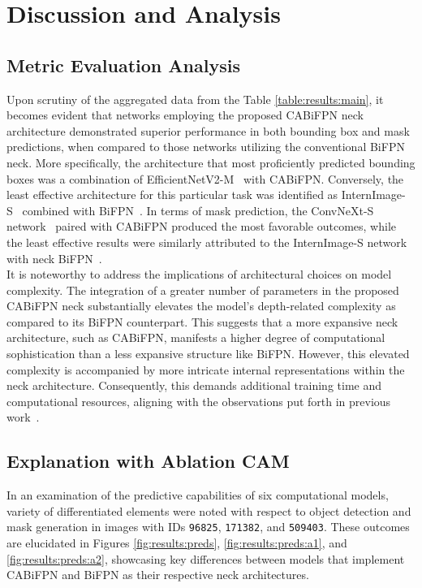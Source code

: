 \chapter{Discussion and Analysis}

\section{Metric Evaluation Analysis} \label{sec:40:metrics}
Upon scrutiny of the aggregated data from the Table \ref{table:results:main}, it becomes evident that networks employing the proposed CABiFPN neck architecture demonstrated superior performance in both bounding box and mask predictions, when compared to those networks utilizing the conventional BiFPN neck. More specifically, the architecture that most proficiently predicted bounding boxes was a combination of EfficientNetV2-M~\cite{tan2021efficientnetv2} with CABiFPN. Conversely, the least effective architecture for this particular task was identified as InternImage-S~\cite{wang2023internimage} combined with BiFPN~\cite{tan2020efficientdet}. In terms of mask prediction, the ConvNeXt-S network~\cite{liu2022convnet} paired with CABiFPN produced the most favorable outcomes, while the least effective results were similarly attributed to the InternImage-S network~\cite{wang2023internimage} with neck BiFPN~\cite{tan2020efficientdet}.\\

It is noteworthy to address the implications of architectural choices on model complexity. The integration of a greater number of parameters in the proposed CABiFPN neck substantially elevates the model's depth-related complexity as compared to its BiFPN counterpart. This suggests that a more expansive neck architecture, such as CABiFPN, manifests a higher degree of computational sophistication than a less expansive structure like BiFPN. However, this elevated complexity is accompanied by more intricate internal representations within the neck architecture. Consequently, this demands additional training time and computational resources, aligning with the observations put forth in previous work~\cite{Bengio2009}.

\section{Explanation with Ablation CAM}
In an examination of the predictive capabilities of six computational models, variety of differentiated elements were noted with respect to object detection and mask generation in images with IDs \texttt{96825}, \texttt{171382}, and \texttt{509403}. These outcomes are elucidated in Figures \ref{fig:results:preds}, \ref{fig:results:preds:a1}, and \ref{fig:results:preds:a2}, showcasing key differences between models that implement CABiFPN and BiFPN as their respective neck architectures.\\

